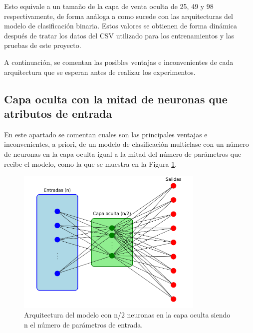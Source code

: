 Esto equivale a un tamaño de la capa de venta oculta de 25, 49 y 98 respectivamente, de forma análoga a como sucede con las arquitecturas del modelo de clasificación binaria. Estos valores se obtienen de forma dinámica después de tratar los datos del CSV utilizado para los entrenamientos y las pruebas de este proyecto.

A continuación, se comentan las posibles ventajas e inconvenientes de cada arquitectura que se esperan antes de realizar los experimentos.

\subsection{Capa oculta con la mitad de neuronas que atributos de entrada}\label{sec:VIMUL25}
En este apartado se comentan cuales son las principales ventajas e inconvenientes, a priori, de un modelo de clasificación multiclase con un número de neuronas en la capa oculta igual a la mitad del número de parámetros que recibe el modelo, como la que se muestra en la Figura \ref{fig:arqnmediosMUL}.

\begin{figure}[H]
    \centering
    \includegraphics[width=0.8\textwidth]{./img/modelo/arquitecturas/arqnmediosMUL.pdf}
    \caption{Arquitectura del modelo con n/2 neuronas en la capa oculta siendo n el número de parámetros de entrada.}
    \label{fig:arqnmediosMUL}
\end{figure}

